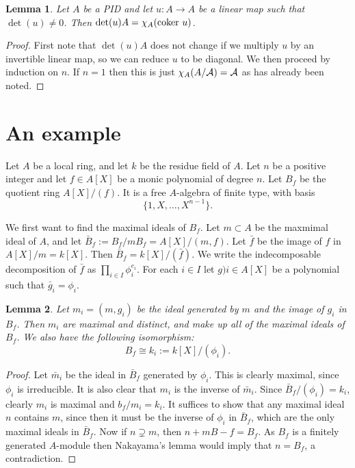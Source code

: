 \documentclass[11pt]{article} %
\newtheorem{lem}{Lemma}
\theoremstyle{remark}\newtheorem*{rem}{Remark}
\begin{document}
\begin{lem}
 Let $A$ be a PID and let $u:A\rightarrow A$ be a linear map such that $\det (u) \neq 0$.
 Then $\det (u) A = \chi_A ({\rm coker }\ u)$.
\end{lem}
\begin{proof}
 First note that $\det (u) A$ does not change if we multiply $u$ by an invertible linear map, so we can reduce $u$ to be diagonal.
 We then proceed by induction on $n$.
 If $n=1$ then this is just $\chi_A (A/{\cal A}) = \cal A$ as has already been noted.
\end{proof}

\section{An example}
Let $A$ be a local ring, and let $k$ be the residue field of $A$.
Let $n$ be a positive integer and let $f\in A[X]$ be a monic polynomial of degree $n$.
Let $B_f$ be the quotient ring $A[X]/(f)$.
It is a free $A$-algebra of finite type, with basis
\[
\{1,X,\ldots , X^{n-1}\}.
\]

We first want to find the maximal ideals of $B_f$.
Let $m\subset A$ be the maxmimal ideal of $A$, and let $\bar B_f := B_f/mB_f = A[X]/(m,f)$.
Let $\bar f$ be the image of $f$ in $A[X]/m = k[X]$.
Then $\bar B_f = k[X]/(\bar f)$.
We write the indecomposable decomposition of $\bar f$ as $\prod _{i\in I} \phi_i^{e_i}$.
For each $i \in I$ let $g)i \in A[X]$ be a polynomial such that $\bar g_i = \phi_i$.

\begin{lem}
Let $m_i = (m,g_i)$ be the ideal generated by $m$ and the image of $g_i$ in $B_f$.
Then $m_i$ are maximal and distinct, and make up all of the maximal ideals of $B_f$.
We also have the following isomorphism:
\[
B_f \cong k_i := k[X]/(\phi_i).
\]
\end{lem}

\begin{proof}
Let $\bar m_i$ be the ideal in $\bar B_f$ generated by $\phi_i$.
This is clearly maximal, since $\phi_i$ is irreducible.
It is also clear that $m_i$ is the inverse of $\bar m_i$.
Since $\bar B_f /(\phi_i) = k_i$, clearly $m_i$ is maximal and $b_f/m_i = k_i$.
It suffices to show that any maximal ideal $n$ contains $m$, since then it must be the inverse of $\phi_i$ in $\bar B_f$, which are the only maximal ideals in $\bar B_f$.
Now if $n \supsetneq m$, then $n + mB-f = B_f$.
As $B_f$ is a finitely generated $A$-module then Nakayama's lemma would imply that $n = B_f$, a contradiction.
\end{proof}
\end{document}
